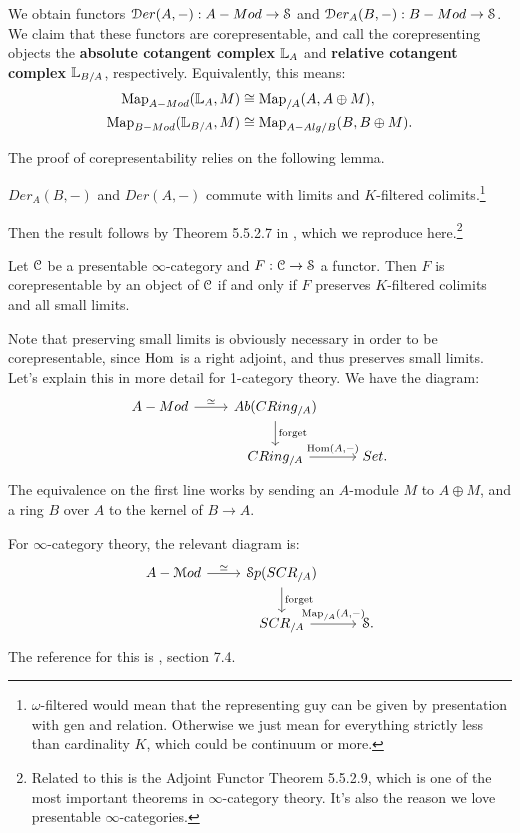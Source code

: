 We obtain functors $\mathcal D er(A,-) : A-Mod \to \mathcal S$ and $\mathcal D er_A(B,-) : B-Mod \to \mathcal S$. We claim that these functors are corepresentable,
and call the corepresenting objects the \textbf{absolute cotangent complex} $\mathbb L_A$ and \textbf{relative cotangent complex}
$\mathbb L_{B/A}$, respectively. Equivalently, this means:
\begin{align*}
\operatorname{Map}_{A-Mod}(\mathbb L_{A}, M) &\cong \operatorname{Map}_{/A}(A, A\oplus M), \\
\operatorname{Map}_{B-Mod}(\mathbb L_{B/A}, M) &\cong \operatorname{Map}_{A-Alg/B}(B, B\oplus M).
\end{align*}

The proof of corepresentability relies on the following lemma.
\begin{lem}
\item $Der_A(B,-)$ and $Der(A,-)$ commute with limits and $K$-filtered colimits.\footnote{
$\omega$-filtered would mean that the representing guy can be given by presentation with gen and relation. Otherwise we just
mean for everything strictly less than cardinality $K$, which could be continuum or more.} 
\end{lem}

Then the result follows by Theorem 5.5.2.7 in \cite{HTT}, which we reproduce here.\footnote{Related to this is the Adjoint
Functor Theorem 5.5.2.9, which is one of the most important theorems in $\infty$-category theory. It's also the reason
we love presentable $\infty$-categories.}

\begin{thm}
Let $\mathcal C$ be a presentable $\infty$-category and $F : \mathcal C \to \mathcal S$ a functor. Then $F$ is corepresentable by an object of
$\mathcal C$ if and only if $F$ preserves $K$-filtered colimits and all small limits.
\end{thm}

\begin{rem}
Note that preserving small limits is obviously necessary in order to be corepresentable, since $\operatorname{Hom}$ is a right adjoint,
and thus preserves small limits. Let's explain this in more detail
for 1-category theory. We have the diagram:
\[
\begin{tikzcd}
A-Mod \arrow{r}{\simeq} & Ab(CRing_{/A})\arrow{d}{\text{forget}} & \\
 & CRing_{/A} \arrow{r}{\Hom(A, -)} & Set .
\end{tikzcd}
\]
The equivalence on the first line works by sending an $A$-module $M$ to $A \oplus M$, and a ring $B$ over $A$ to the kernel
of $B \to A$. 

For $\infty$-category theory, the relevant diagram is:
\[
\begin{tikzcd}
A-\cM od \arrow{r}{\simeq} & \cS p(SCR_{/A})\arrow{d}{\text{forget}} & \\
 & SCR_{/A} \arrow{r}{\Map_{/A}(A, -)} & \cS .
\end{tikzcd}
\]
The reference for this is \cite{Lurie_Higher_algebra}, section 7.4.
\end{rem}


